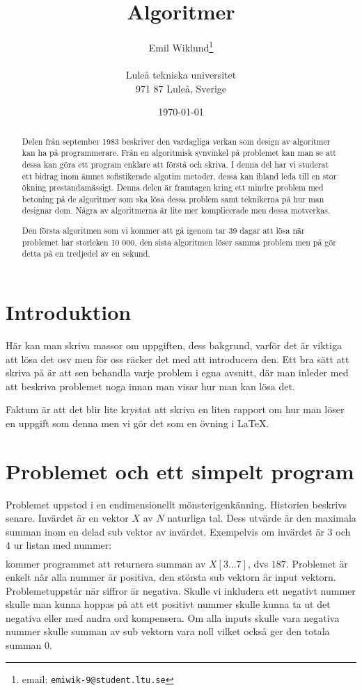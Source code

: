 \documentclass[a4paper,12pt]{article}
\title{Algoritmer}
\author{Emil Wiklund\thanks{email: \texttt{emiwik-9@student.ltu.se}}\\  
        ~ \\
        Luleå tekniska universitet \\ 
        971 87 Luleå, Sverige}
\date{\today}
\begin{document}
\linenumbers


\maketitle


\begin{abstract}
  Delen från september 1983 beskriver den vardagliga verkan som design av
  algoritmer kan ha på programmerare. Från en algoritmisk synvinkel på
  problemet kan man se att dessa kan göra ett program enklare att förstå
  och skriva. I denna del har vi studerat ett bidrag inom ämnet sofistikerade
  algotim metoder, dessa kan ibland leda till en stor ökning prestandamässigt. 
  Denna delen är framtagen kring ett mindre problem med betoning på de
  algoritmer som ska lösa dessa problem samt teknikerna på hur man designar
  dom. Några av algoritmerna är lite mer komplicerade men dessa motverkas. 


  Den första algoritmen som vi kommer att gå igenom tar 39 dagar att lösa när
  problemet har storleken 10 000, den sista algoritmen löser samma problem
  men på gör detta på en tredjedel av en sekund. 
\end{abstract}


\section{Introduktion}
\label{sec:introduktion}


Här kan man skriva massor om uppgiften, dess bakgrund, varför det är
viktiga att lösa det osv men för oss räcker det med att introducera
den. Ett bra sätt att skriva på är att sen behandla varje problem i
egna avsnitt, där man inleder med att beskriva problemet noga innan
man visar hur man kan lösa det.


Faktum är att det blir lite krystat att skriva en liten rapport om hur
man löser en uppgift som denna men vi gör det som en övning i \LaTeX. 


\section{Problemet och ett simpelt program}
\label{sec:uppg1}


  Problemet uppstod i en endimensionellt mönsterigenkänning. Historien beskrivs
senare. Invärdet är en vektor $X$ av $N$ naturliga tal. Dess utvärde är den
maximala
summan inom en delad sub vektor av invärdet. Exempelvis om invärdet är $3$ och
$4$ ur listan med nummer:
%
\begin{align*}
  [31, -41, 59, 26, -53, 58, 97, -93, -23, 84]
\end{align*}
%
kommer programmet att returnera summan av $X[3...7]$, dvs $187$. Problemet är
enkelt
när alla nummer är positiva, den största sub vektorn är input vektorn.
Problemetuppstår när siffror är negativa. Skulle vi inkludera ett negativt
nummer skulle man kunna hoppas på att ett positivt nummer skulle kunna ta ut det
negativa eller med andra ord kompensera. Om alla inputs skulle vara negativa
nummer skulle summan av sub vektorn vara noll vilket också ger den totala
summan $0$.
 
\end{document}
